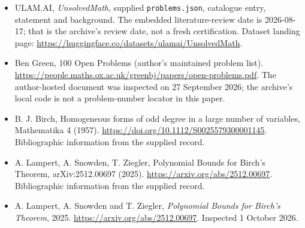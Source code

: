 \documentclass[11pt,a4paper]{article}
\begin{document}
{\small

\begin{itemize}

\item[\hypertarget{source:statement:1}{S1}] ULAM.AI, \emph{UnsolvedMath}, supplied \texttt{problems.json}, catalogue entry, statement and background. The embedded literature-review date is 2026-08-17; that is the archive’s review date, not a fresh certification. Dataset landing page: \url{https://huggingface.co/datasets/ulamai/UnsolvedMath}.

\item[\hypertarget{source:statement:2}{S2}] Ben Green, 100 Open Problems (author’s maintained problem list). \url{https://people.maths.ox.ac.uk/greenbj/papers/open-problems.pdf}. The author-hosted document was inspected on 27 September 2026; the archive’s local code is not a problem-number locator in this paper.

\item[\hypertarget{source:statement:3}{S3}] B. J. Birch, Homogeneous forms of odd degree in a large number of variables, Mathematika 4 (1957). \url{https://doi.org/10.1112/S0025579300001145}. Bibliographic information from the supplied record.

\item[\hypertarget{source:statement:4}{S4}] A. Lampert, A. Snowden, T. Ziegler, Polynomial Bounds for Birch's Theorem, arXiv:2512.00697 (2025). \url{https://arxiv.org/abs/2512.00697}. Bibliographic information from the supplied record.

\item[E1] A. Lampert, A. Snowden and T. Ziegler, \emph{Polynomial Bounds for Birch's Theorem}, 2025. \url{https://arxiv.org/abs/2512.00697}. Inspected 1 October 2026.

\end{itemize}

}

\label{end:statement}
\end{document}
